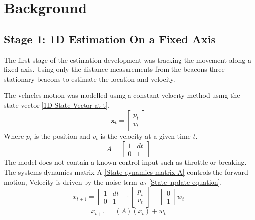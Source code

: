 \section{Background}
\label{sec:background}

\subsection{Stage 1: 1D Estimation On a Fixed Axis}
The first stage of the estimation development was tracking the movement along a fixed axis. Using only the distance measurements from the beacons three stationary beacons to estimate the location and velocity.

\noindent The vehicles motion was modelled using a constant velocity method using the state vector \eqref{1D State Vector at t}. 
\begin{equation}
\label{1D State Vector at t}
    \mathbf{x}_t = \begin{bmatrix} p_t \\ v_t \end{bmatrix}
\end{equation}
Where $p_t$ is the position and $v_t$ is the velocity at a given time $t$.
\begin{equation}
\label{State dynamics matrix A}
    A = \begin{bmatrix} 1 & dt \\ 0 & 1 \end{bmatrix}
\end{equation}
The model does not contain a known control input such as throttle or breaking. The systems dynamics matrix A \eqref{State dynamics matrix A} controls the forward motion, Velocity is driven by the noise term $w_t$ \eqref{State update equation}.
\begin{equation}
\label{State update equation}
    x_{t+1} = \begin{bmatrix} 1 & dt \\ 0 & 1 \end{bmatrix} \cdot \begin{bmatrix} p_t \\ v_t \end{bmatrix} + \begin{bmatrix} 0 \\ 1 \end{bmatrix} w_t
\end{equation}
\begin{equation}
\label{State update equation simple}
    x_{t+1} = (A)(x_t) + w_t
\end{equation}
